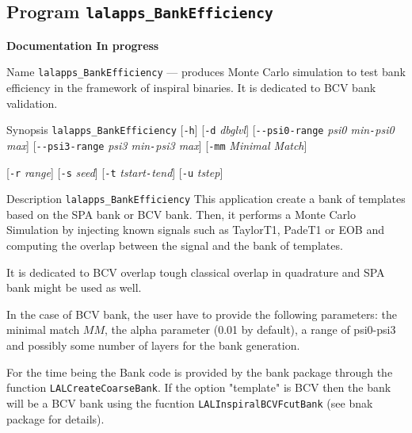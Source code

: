 \subsection{Program \texttt{lalapps\_BankEfficiency}}
\label{program:lalapps-BankEfficiency}
{\LARGE{{\bf Documentation In progress}}}

\begin{entry}

\item[Name]
\verb$lalapps_BankEfficiency$ --- produces Monte Carlo simulation to test bank efficiency
in the framework of inspiral binaries. It is dedicated to BCV bank validation.

\item[Synopsis]
\verb$lalapps_BankEfficiency$ [\verb$-h$] 
[\verb$-d$ \textit{dbglvl}]
[\verb$--psi0-range$ \textit{psi0 min}\texttt{-}\textit{psi0 max}]
[\verb$--psi3-range$ \textit{psi3 min}\texttt{-}\textit{psi3 max}]
[\verb$-mm$ \textit{Minimal Match}]

[\verb$-r$ \textit{range}]
[\verb$-s$ \textit{seed}]
[\verb$-t$ \textit{tstart}\texttt{-}\textit{tend}]
[\verb$-u$ \textit{tstep}]

\item[Description]
\verb$lalapps_BankEfficiency$ This application create a bank of templates based on the
SPA bank or BCV bank. Then, it performs a Monte Carlo Simulation by injecting known signals
such as TaylorT1, PadeT1 or EOB and computing the overlap between the signal and the 
bank of templates.
 
It is dedicated to BCV overlap tough  classical overlap in quadrature and SPA bank might
be used as well. 

In the case of BCV bank, the user have to provide the following parameters: the minimal 
match $MM$, the alpha parameter (0.01 by default), a range of psi0-psi3 and possibly
some number of layers for the bank generation. 

For the time being the Bank code is provided by the bank package through the function
\texttt{LALCreateCoarseBank}. If the option "template" is BCV then the bank will be a BCV bank
using the fucntion \texttt{LALInspiralBCVFcutBank} (see bnak package for details).




\end{entry}
